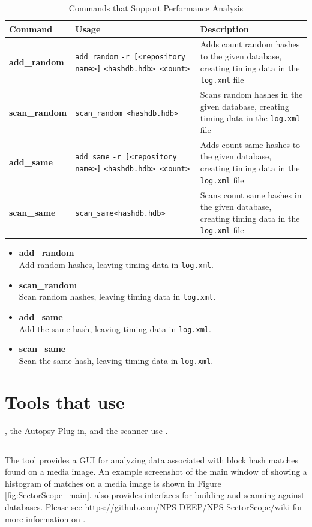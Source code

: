 \documentclass[11pt,fleqn]{article} %
\begin{document}
\begin{table}[!ht]
\centering
\caption{Commands that Support \hdb Performance Analysis}
\label{tab:analysis}
\begin{tabular}{|p{3.5 cm}|p{6 cm}|p{4 cm}|}
\hline \hline
\textbf{Command} & \textbf{Usage} & \textbf{Description} \\
\hline
\textbf{add\_random} & \verb+add_random+ \verb+-r [<repository name>]+ \verb+<hashdb.hdb> <count>+ & Adds count random hashes to the given database, creating timing data in the \texttt{log.xml} file\\
\hline
\textbf{scan\_random} & \verb+scan_random <hashdb.hdb>+ & Scans random hashes in the given database, creating timing data in the \texttt{log.xml} file\\
\hline
\textbf{add\_same} & \verb+add_same+ \verb+-r [<repository name>]+ \verb+<hashdb.hdb> <count>+ & Adds count same hashes to the given database, creating timing data in the \texttt{log.xml} file\\
\hline
\textbf{scan\_same} & \verb+scan_same<hashdb.hdb>+ & Scans count same hashes in the given database, creating timing data in the \texttt{log.xml} file\\
\hline
\end{tabular}
\end{table}

\begin{itemize}
\item \textbf{add\_random}\\
Add random hashes, leaving timing data in \verb+log.xml+.
\item \textbf{scan\_random}\\
Scan random hashes, leaving timing data in \verb+log.xml+.
\item \textbf{add\_same}\\
Add the same hash, leaving timing data in \verb+log.xml+.
\item \textbf{scan\_same}\\
Scan the same hash, leaving timing data in \verb+log.xml+.
\end{itemize}

\section{Tools that use \hdb}
\label{OtherTools}
\sscope, the \sscope Autopsy Plug-in, and the \bulk \hdb scanner use \hdb.

\subsection{\sscope}
The \sscope tool provides a GUI for analyzing data associated with block hash matches found on a media image. An example screenshot of the main window of \sscope showing a histogram of matches on a media image is shown in Figure \ref{fig:SectorScope_main}. \sscope also provides interfaces for building and scanning against \hdb databases. Please see \url{https://github.com/NPS-DEEP/NPS-SectorScope/wiki} for more information on \sscope.
\end{document}
